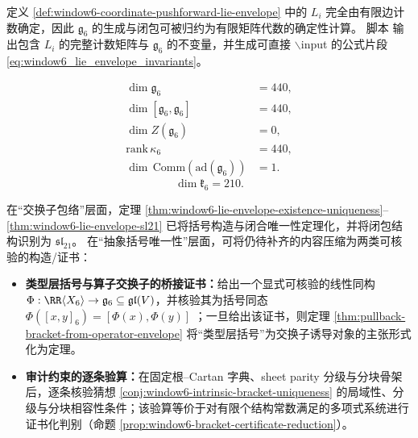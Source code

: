 \begin{remark}[可审计证书接口]\label{rem:window6-lie-envelope-audit-route}
定义 \ref{def:window6-coordinate-pushforward-lie-envelope} 中的 \(L_i\) 完全由有限边计数确定，因此 \(\mathfrak{g}_6\) 的生成与闭包可被归约为有限矩阵代数的确定性计算。
脚本 \texttt{} 输出包含 \(L_i\) 的完整计数矩阵与 \(\mathfrak{g}_6\) 的不变量，并生成可直接 \(\backslash\)input 的公式片段 \eqref{eq:window6_lie_envelope_invariants}。
\end{remark}

\begin{equation*}
\begin{aligned}
\dim\mathfrak{g}_6&=440,\\
\dim[\mathfrak{g}_6,\mathfrak{g}_6]&=440,\\
\dim Z(\mathfrak{g}_6)&=0,\\
\mathrm{rank}\,\kappa_6&=440,\\
\dim\,\mathrm{Comm}(\mathrm{ad}(\mathfrak{g}_6))&=1.
\end{aligned}
\end{equation*}
\begin{equation*}
\dim\mathfrak{k}_6=210.
\end{equation*}

\begin{remark}[从审计对象到定理链条的缺口定位]\label{rem:window6-bracket-closure-gaps}
在“交换子包络”层面，定理 \ref{thm:window6-lie-envelope-existence-uniqueness}--\ref{thm:window6-lie-envelope-sl21} 已将括号构造与闭合唯一性定理化，并将闭包结构识别为 \(\mathfrak{sl}_{21}\)。
在“抽象括号唯一性”层面，可将仍待补齐的内容压缩为两类可核验的构造/证书：
\begin{itemize}
  \item \textbf{类型层括号与算子交换子的桥接证书：}给出一个显式可核验的线性同构 \(\Phi:\RR\langle X_6\rangle\to\mathfrak{g}_6\subseteq\mathfrak{gl}(V)\)，并核验其为括号同态
  \(
  \Phi([x,y]_6)=[\Phi(x),\Phi(y)]
  \)
 ；一旦给出该证书，则定理 \ref{thm:pullback-bracket-from-operator-envelope} 将“类型层括号”为交换子诱导对象的主张形式化为定理。
  \item \textbf{审计约束的逐条验算：}在固定根--Cartan 字典、sheet parity 分级与分块骨架后，逐条核验猜想 \ref{conj:window6-intrinsic-bracket-uniqueness} 的局域性、分级与分块相容性条件；该验算等价于对有限个结构常数满足的多项式系统进行证书化判别（命题 \ref{prop:window6-bracket-certificate-reduction}）。
\end{itemize}
\end{remark}

